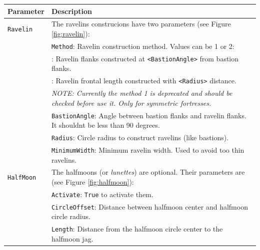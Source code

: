 \documentclass[tog]{acmsiggraph}
\begin{document}
\begin{tabularx}{0.48\textwidth}{ |l|X| }
\hline 
\textbf{Parameter} & \textbf{Description} \\[0.15cm]
 \hline
  \texttt{Ravelin} & The ravelins construcions have two parameters (see Figure \ref{fig:ravelin}): \\
  & \quad\texttt{Method}: Ravelin construction method. Values can be 1 or 2: \\
  & \quad\quad 1: Ravelin flanks constructed at \texttt{<BastionAngle>} from bastion flanks. \\
  & \quad\quad 2: Ravelin frontal length constructed with \texttt{<Radius>} distance. \\ 
  & \quad \textit{NOTE: Currently the method 1 is deprecated and should be checked before use it. Only for symmetric fortresses.} \\
  & \quad\texttt{BastionAngle}: Angle between bastion flanks and ravelin flanks. It shouldnt be less than 90 degrees. \\
  & \quad\texttt{Radius}: Circle radius to construct ravelins (like bastions).  \\
  & \quad\texttt{MinimumWidth}: Minimum ravelin width. Used to avoid too thin ravelins. \\
  \hline
  \texttt{HalfMoon} & The halfmoons (or \textit{lunettes}) are optional. Their parameters are (see Figure \ref{fig:halfmoon}): \\
  & \quad\texttt{Activate}: \texttt{True} to activate them.\\
  & \quad\texttt{CircleOffset}: Distance between halfmoon center and halfmoon circle radius.\\
  & \quad\texttt{Length}: Distance from the halfmoon circle center to the halfmoon jag. \\
  \hline
\end{tabularx}  
 
\end{document}
